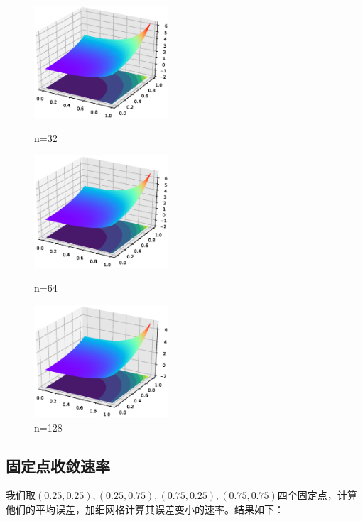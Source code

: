 \documentclass[12]{article}%
\begin{document}
\begin{figure}[H]
    \centering
    \begin{minipage}[t]{0.3\textwidth}
    \centering
    \includegraphics[width=5cm]{../pic/fun332.eps}
    \caption{n=32}
    \end{minipage}
    \begin{minipage}[t]{0.3\textwidth}
    \centering
    \includegraphics[width=5cm]{../pic/fun364.eps}
    \caption{n=64}
    \end{minipage}
    \begin{minipage}[t]{0.3\textwidth}
    \centering
    \includegraphics[width=5cm]{../pic/fun3128.eps}
    \caption{n=128}
    \end{minipage}
\end{figure}
\subsection{固定点收敛速率}
我们取$(0.25,0.25),(0.25,0.75),(0.75,0.25),(0.75,0.75)$四个固定点，计算他们的平均误差，加细网格计算其误差变小的速率。结果如下：
\end{document}
